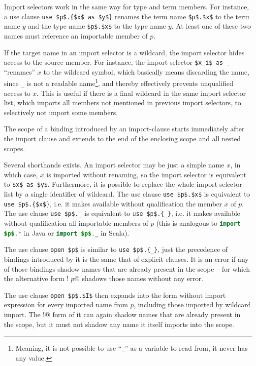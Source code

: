 Import selectors work in the same way for type and term members. For instance, a use clause \lstinline!use $p$.{$x$ as $y$}! renames the term name \lstinline!$p$.$x$! to the term name $y$ and the type name \lstinline!$p$.$x$! to the type name $y$. At least one of these two names must reference an importable member of $p$. 

If the target name in an import selector is a wildcard, the import selector hides access to the source member. For instance, the import selector \lstinline!$x_i$ as _! ``renames'' $x$ to the wildcard symbol, which basically means discarding the name, since \lstinline!_! is not a readable name\footnote{Meaning, it is not possible to use ``\lstinline!_!'' as a variable to read from, it never has any value.}, and thereby effectively prevents unqualified access to $x$. This is useful if there is a final wildcard in the same import selector list, which imports all members not mentioned in previous import selectors, to selectively not import some members. 

The scope of a binding introduced by an import-clause starts immediately after the import clause and extends to the end of the enclosing scope and all nested scopes. 

Several shorthands exists. An import selector may be just a simple name $x$, in which case, $x$ is imported without renaming, so the import selector is equivalent to \lstinline!$x$ as $y$!. Furthermore, it is possible to replace the whole import selector list by a single identifier of wildcard. The use clause \lstinline!use $p$.$x$! is equivalent to \lstinline!use $p$.{$x$}!, i.e. it makes available without qualification the member $x$ of $p$. The use clause \lstinline!use $p$._! is equivalent to \lstinline!use $p$.{_}!, i.e. it makes available without qualification all importable members of $p$ (this is analogous to \lstinline[language=Java]!import $p$.*! in Java or \lstinline[language=Java]!import $p$._! in Scala). 

The use clause \lstinline!open $p$! is similar to \lstinline!use $p$.{_}!, just the precedence of bindings introduced by it is the same that of explicit  clauses. It is an error if any of those bindings shadow names that are already present in the scope -- for which the alternative form \lstinline@open! $p$@ shadows those names without any error. 

The use clause \lstinline!open $p$.$I$! then expands into the form without import expression for every imported name from $p$, including those imported by wildcard import. The \lstinline@open!@ form of it can again shadow names that are already present in the scope, but it must not shadow any name it itself imports into the scope. 

